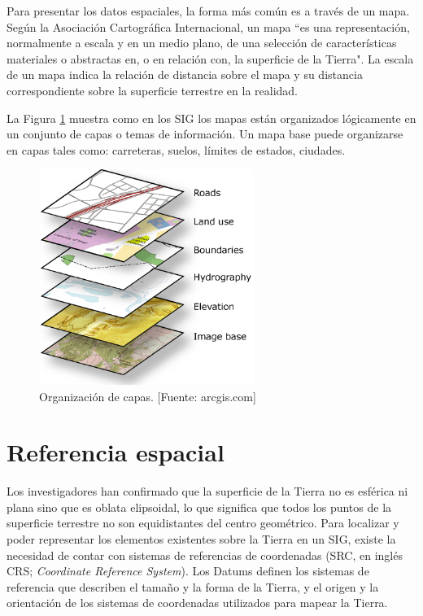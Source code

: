 Para presentar los datos espaciales, la forma más común es a través de un mapa. Según la Asociación Cartográfica Internacional, un mapa ``es una representación, normalmente a escala y en un medio plano, de una selección de características materiales o abstractas en, o en relación con, la superficie de la Tierra". La escala de un mapa indica la relación de distancia sobre el mapa y su distancia correspondiente sobre la superficie terrestre en la realidad.

La Figura \ref{fig:capasGis} muestra como en los SIG los mapas están organizados lógicamente en un conjunto de capas o temas de información. Un mapa base puede organizarse en capas tales como: carreteras, suelos, límites de estados, ciudades.

\begin{figure}[H]
    \centering
    \includegraphics[width=7cm]{capas_gis.png}
    \caption{Organización de capas. [Fuente: arcgis.com]}
    \label{fig:capasGis}
\end{figure}

\section{Referencia espacial}

Los investigadores han confirmado que la superficie de la Tierra no es esférica ni plana sino que es oblata elipsoidal, lo que significa que todos los puntos de la superficie terrestre no son equidistantes del centro geométrico. Para localizar y poder representar los elementos existentes sobre la Tierra en un SIG, existe la necesidad de contar con sistemas de referencias de coordenadas (SRC, en inglés CRS; \textit{Coordinate Reference System}). Los Datums definen los sistemas de referencia que describen el tamaño y la forma de la Tierra, y el origen y la orientación de los sistemas de coordenadas utilizados para mapear la Tierra.

